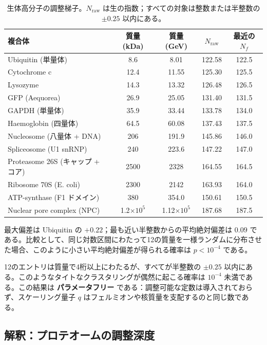 \documentclass[12pt,a4paper]{ltjsarticle}
\begin{document}
	\begin{table}[H]
		\centering
		\caption{生体高分子の調整梯子。\(N_{\mathrm{raw}}\) は生の指数；すべての対象は整数または半整数の \(\pm 0.25\) 以内にある。}
		\label{tab:protein_masses}
		\small
		\begin{tabular}{l c c c c}
			\toprule
			複合体 & 質量 (kDa) & 質量 (GeV) & \(N_{\mathrm{raw}}\) & 最近の \(N_f\) \\
			\midrule
			Ubiquitin (単量体)          & 8.6   & 8.01  & 122.58 & 122.5 \\
			Cytochrome c                 & 12.4  & 11.55 & 125.30 & 125.5 \\
			Lysozyme                     & 14.3  & 13.32 & 126.48 & 126.5 \\
			GFP (Aequorea)               & 26.9  & 25.05 & 131.40 & 131.5 \\
			GAPDH (単量体)              & 35.9  & 33.44 & 133.78 & 134.0 \\
			Haemoglobin (四量体)       & 64.5  & 60.08 & 137.43 & 137.5 \\
			Nucleosome (八量体 + DNA)   & 206   & 191.9 & 145.86 & 146.0 \\
			Spliceosome (U1 snRNP)       & 240   & 223.6 & 147.22 & 147.0 \\
			Proteasome 26S (キャップ + コア)  & 2500  & 2328  & 164.55 & 164.5 \\
			Ribosome 70S (E. coli)       & 2300  & 2142  & 163.93 & 164.0 \\
			ATP-synthase (F1 ドメイン)     & 380   & 354.0 & 150.61 & 150.5 \\
			Nuclear pore complex (NPC)   & 1.2\(\times10^5\) & 1.12\(\times10^5\) & 187.68 & 187.5 \\
			\bottomrule
		\end{tabular}
		\par\smallskip
		\footnotesize
		最大偏差は Ubiquitin の \(+0.22\)；最も近い半整数からの平均絶対偏差は \(0.09\) である。比較として、同じ対数区間にわたって12の質量を一様ランダムに分布させた場合、このように小さい平均絶対偏差が得られる確率は \(p < 10^{-4}\) である。
	\end{table}
	
	12のエントリは質量で4桁以上にわたるが、すべてが半整数の \(\pm 0.25\) 以内にある。このようなタイトなクラスタリングが偶然に起こる確率は \(10^{-4}\) 未満である。この結果は \textbf{パラメータフリー} である：調整可能な定数は導入されておらず、スケーリング量子 \(q\) はフェルミオンや核質量を支配するのと同じ数である。
	
	\subsection{解釈：プロテオームの調整深度}
	
\end{document}
